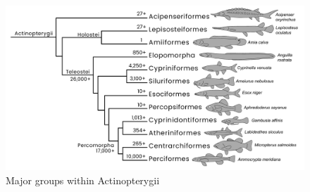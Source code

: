\documentclass[a4paper,12pt]{article}
\begin{document}
\begin{description}
\begin{figure}[H]
\centering
  \includegraphics[scale=0.4]{Actinopterygii_tre.pdf}
  \caption{Major groups within Actinopterygii}
  \label{fig:Actinopterygii}
\end{figure}


\end{description}
\end{document}
